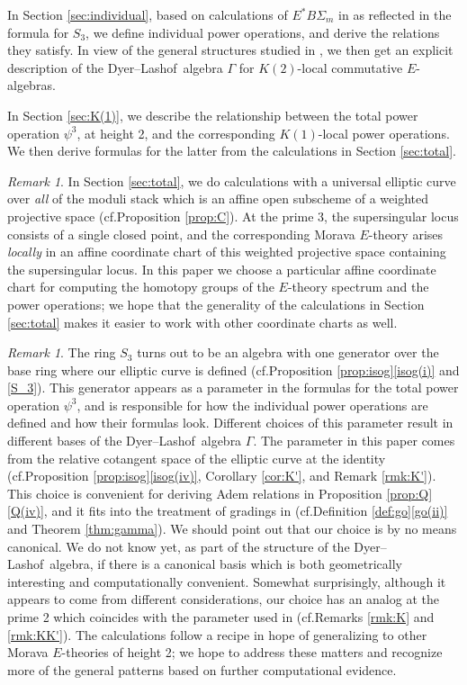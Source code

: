 \documentclass{gtpart}
\theoremstyle{definition}
\theoremstyle{remark}
\newtheorem{rmk}[thm]{Remark}
\newcommand{\cf}{cf.\thinspace}
\newcommand{\DL}{Dyer--Lashof~}
\newcommand{\G}{\Gamma}
\newcommand{\p}{\psi^3}
\newcommand{\isog}[1]{Proposition \ref{prop:isog}\thinspace \eqref{isog(#1)}}
\newcommand{\q}[1]{Proposition \ref{prop:Q}\thinspace \eqref{Q(#1)}}
\newcommand{\go}[1]{Definition \ref{def:go}\thinspace \eqref{go(#1)}}
\begin{document}
In Section \ref{sec:individual}, based on calculations of $E^* B\Sigma_m$ in \cite{Str98} as reflected in the formula for $S_3$, 
we define individual power operations, and derive the relations they satisfy.  
In view of the general structures studied in \cite{cong}, 
we then get an explicit description of the \DL algebra $\G$ for $K(2)$-local commutative $E$-algebras.  

In Section \ref{sec:K(1)}, we describe the relationship between the total power operation $\p$, at height 2, and the corresponding $K(1)$-local power operations.  
We then derive formulas for the latter from the calculations in Section \ref{sec:total}.  

\begin{rmk}
\label{rmk:grading}
 In Section \ref{sec:total}, we do calculations with a universal elliptic curve 
 over {\em all} of the moduli stack which is an affine open subscheme 
 of a weighted projective space (\cf Proposition \ref{prop:C}).  
 At the prime 3, the supersingular locus consists of a single closed point, 
 and the corresponding Morava $E$-theory arises {\em locally} 
 in an affine coordinate chart of this weighted projective space containing the supersingular locus.  
 In this paper we choose a particular affine coordinate chart 
 for computing the homotopy groups of the $E$-theory spectrum and the power operations; 
 we hope that the generality of the calculations in Section \ref{sec:total} 
 makes it easier to work with other coordinate charts as well.  
\end{rmk}

\begin{rmk}
\label{rmk:parameter}
 The ring $S_3$ turns out to be an algebra with one generator over the base ring where our elliptic curve is defined 
 (\cf \isog{i} and \eqref{S_3}).  This generator appears as a parameter in the formulas for the total power operation $\p$, 
 and is responsible for how the individual power operations are defined and how their formulas look.  
 Different choices of this parameter result in different bases of the \DL algebra $\G$.  
 The parameter in this paper comes from the relative cotangent space of the elliptic curve at the identity 
 (\cf \isog{iv}, Corollary \ref{cor:K'}, and Remark \ref{rmk:K'}).  
 This choice is convenient for deriving Adem relations in \q{iv}, 
 and it fits into the treatment of gradings in \cite[Section 2]{cong} (\cf \go{ii} and Theorem \ref{thm:gamma}).  
 We should point out that our choice is by no means canonical.  
 We do not know yet, as part of the structure of the \DL algebra, 
 if there is a canonical basis which is both geometrically interesting and computationally convenient.  
 Somewhat surprisingly, although it appears to come from different considerations, 
 our choice has an analog at the prime 2 which coincides with the parameter used in \cite{h2p2} (\cf Remarks \ref{rmk:K} and \ref{rmk:KK'}).  
 The calculations follow a recipe in hope of generalizing to other Morava $E$-theories of height 2; 
 we hope to address these matters and recognize more of the general patterns based on further computational evidence.  
\end{rmk}
\end{document}

